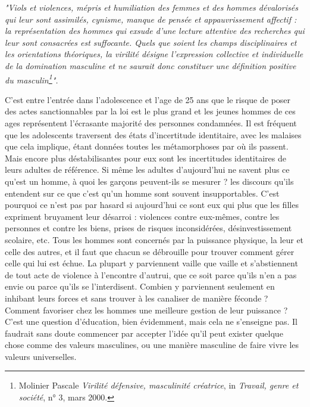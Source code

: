 { 

\begin{displayquote}
 \emph{"Viols et violences, mépris et humiliation des femmes et des hommes dévalorisés qui leur sont assimilés, cynisme, manque de pensée et appauvrissement affectif : la représentation des hommes qui exsude d'une lecture attentive des recherches qui leur sont consacrées est suffocante. Quels que soient les champs disciplinaires et les orientations théoriques, la virilité désigne l'expression collective et individuelle de la domination masculine et ne saurait donc constituer une définition positive du masculin\footnote{Molinier Pascale \emph{Virilité défensive, masculinité créatrice}, in  \emph{Travail, genre et société}, n° 3, mars 2000.}".}
 \end{displayquote}
 
 
 
 C'est entre l'entrée dans l'adolescence et l'age de 25 ans que le risque de poser des actes sanctionnables par la loi est le plus grand et les jeunes hommes de ces ages représentent l'écrasante majorité des personnes condamnées. 
Il est fréquent que les adolescents traversent des états d'incertitude identitaire, avec les malaises que cela implique, étant données toutes les métamorphoses par où ils passent. Mais encore plus déstabilisantes pour eux sont les incertitudes identitaires de leurs adultes de référence. Si même les adultes d'aujourd'hui ne savent plus ce qu'est un homme, à quoi les garçons peuvent-ils se mesurer ? les discours qu'ils entendent sur ce que c'est qu'un homme sont souvent insupportables.
 C'est pourquoi ce n'est pas par hasard si aujourd'hui ce sont eux qui plus que les filles expriment bruyament leur désarroi : violences contre eux-mêmes, contre les personnes et contre les biens, prises de risques inconsidérées, désinvestissement scolaire, etc.
  Tous les hommes sont concernés par la puissance physique, la leur et celle des autres, et il faut que chacun se débrouille pour trouver comment gérer celle qui lui est échue. La plupart y parviennent vaille que vaille et s'abstiennent de tout acte de violence à l'encontre d'autrui, que ce soit parce qu'ils n'en a pas envie ou parce qu'ils se l'interdisent. Combien y parviennent seulement en inhibant leurs forces et sans trouver à les canaliser de manière féconde ? Comment favoriser chez les hommes une meilleure gestion de leur puissance ? C'est une question d'éducation, bien évidemment, mais cela ne s'enseigne pas. 
 Il faudrait sans doute commencer  par accepter l’idée qu'il peut exister quelque chose comme des valeurs masculines, ou une manière masculine de faire vivre les valeurs universelles. 


}
